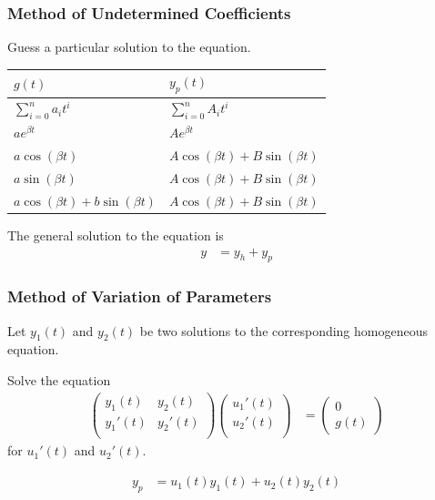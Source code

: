 \documentclass[fleqn, a4paper, 12pt, twoside]{article}
\theoremstyle{definition}
\theoremstyle{theorem}
\begin{document}
\subsubsection{Method of Undetermined Coefficients}

\begin{algorithmic}[1]
	\item
		Guess a particular solution to the equation.\\
		\begin{tabular}{|l|l|}
			\hline
			$g(t)$ & $y_p(t)$\\
			\hline
			$\sum\limits_{i = 0}^{n} a_i t^i$ & $\sum\limits_{i = 0}^{n} A_i t^i$\\
			$a e^{\beta t}$ & $A e^{\beta t}$\\
			$a \cos(\beta t)$ & $A \cos(\beta t) + B \sin(\beta t)$\\
			$a \sin(\beta t)$ & $A \cos(\beta t) + B \sin(\beta t)$\\
			$a \cos(\beta t) + b \sin(\beta t)$ & $A \cos(\beta t) + B \sin(\beta t)$\\
			\hline
		\end{tabular}
	\item
		The general solution to the equation is
		\begin{align*}
			y &= y_h + y_p
		\end{align*}
\end{algorithmic}

\subsubsection{Method of Variation of Parameters}

\begin{algorithmic}[1]
	\item
		Let $y_1(t)$ and $y_2(t)$ be two solutions to the corresponding homogeneous equation.
	\item
		Solve the equation
		\begin{align*}
				\begin{pmatrix}
					y_1(t) & y_2(t)\\
					{y_1}'(t) & {y_2}'(t)\\
				\end{pmatrix}
				\begin{pmatrix}
					{u_1}'(t)\\
					{u_2}'(t)\\
				\end{pmatrix}
			&=
				\begin{pmatrix}
					0\\
					g(t)
				\end{pmatrix}
		\end{align*}
		for ${u_1}'(t)$ and ${u_2}'(t)$.
	\item
		\begin{align*}
			y_p &= u_1(t) y_1(t) + u_2(t) y_2(t)
		\end{align*}
\end{algorithmic}
\end{document}
